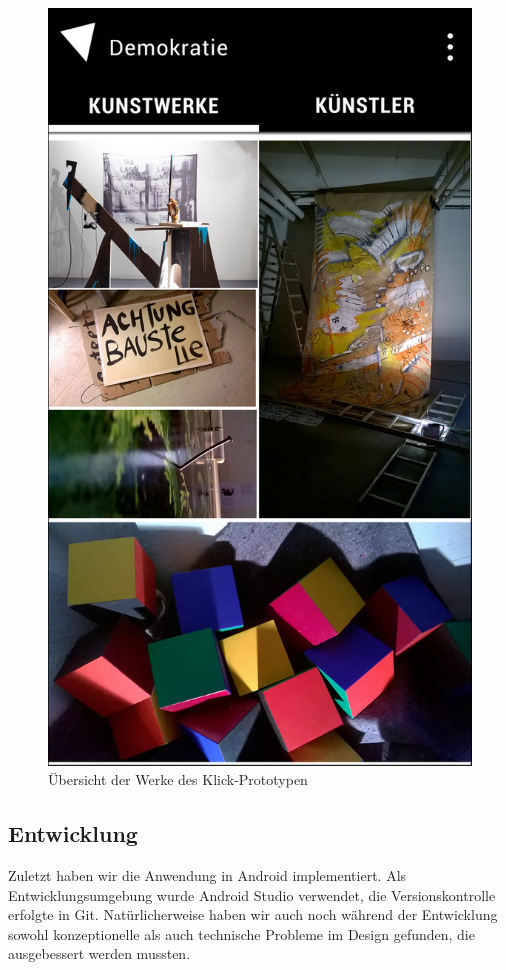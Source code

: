 \begin{figure}[ht]
    \centering
        \includegraphics[width=.25\textwidth]{figures/prototype_werke.png}
    \caption{Übersicht der Werke des Klick-Prototypen}
    \label{fig:prototype_werke}
\end{figure}

\subsection{Entwicklung}
Zuletzt haben wir die Anwendung in Android implementiert. Als Entwicklungsumgebung wurde Android Studio verwendet, die Versionskontrolle erfolgte in Git. Natürlicherweise haben wir auch noch während der Entwicklung sowohl konzeptionelle als auch technische Probleme im Design gefunden, die ausgebessert werden mussten.